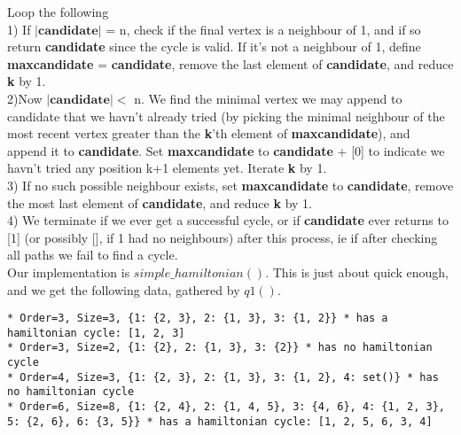 \documentclass[10pt,a4paper]{report}
\begin{document}
Loop the following \\

1) If $|\textbf{candidate}|$ = n, check if the final vertex is a neighbour of 1, and if so return \textbf{candidate} since the cycle is valid. If it's not a neighbour of 1, define \textbf{maxcandidate} = \textbf{candidate}, remove the last element of \textbf{candidate}, and reduce \textbf{k} by 1.\\

2)Now $|\textbf{candidate}|<$ n. We find the minimal vertex we may append to candidate that we havn't already tried (by picking the minimal neighbour of the most recent vertex greater than the \textbf{k}'th element of \textbf{maxcandidate}), and append it to \textbf{candidate}. Set \textbf{maxcandidate} to \textbf{candidate} + [0] to indicate we havn't tried any position k+1 elements yet. Iterate \textbf{k} by 1.\\

3) If no such possible neighbour exists, set \textbf{maxcandidate} to \textbf{candidate}, remove the most last element of \textbf{candidate}, and reduce \textbf{k} by 1. \\

4) We terminate if we ever get a successful cycle, or if \textbf{candidate} ever returns to [1] (or possibly [], if 1 had no neighbours) after this process, ie if after checking all paths we fail to find a cycle. \\

Our implementation is $simple\_hamiltonian()$. This is just about quick enough, and we get the following data, gathered by $q1()$. 

\begin{lstlisting}[breaklines]
* Order=3, Size=3, {1: {2, 3}, 2: {1, 3}, 3: {1, 2}} * has a hamiltonian cycle: [1, 2, 3]
* Order=3, Size=2, {1: {2}, 2: {1, 3}, 3: {2}} * has no hamiltonian cycle
* Order=4, Size=3, {1: {2, 3}, 2: {1, 3}, 3: {1, 2}, 4: set()} * has no hamiltonian cycle
* Order=6, Size=8, {1: {2, 4}, 2: {1, 4, 5}, 3: {4, 6}, 4: {1, 2, 3}, 5: {2, 6}, 6: {3, 5}} * has a hamiltonian cycle: [1, 2, 5, 6, 3, 4]
\end{lstlisting}
\end{document}
